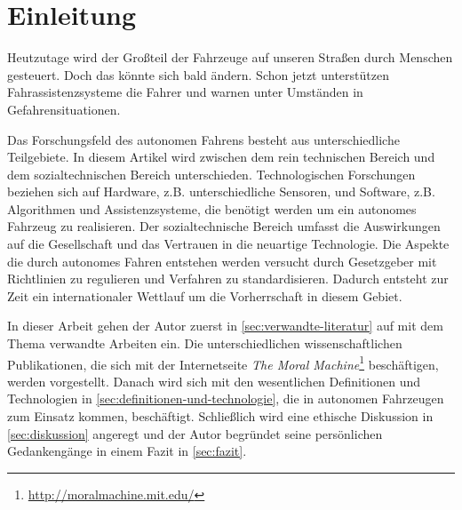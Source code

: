 \section{Einleitung}

Heutzutage wird der Großteil der Fahrzeuge auf unseren Straßen durch Menschen gesteuert. Doch das könnte sich bald ändern. Schon jetzt unterstützen Fahrassistenzsysteme die Fahrer und warnen unter Umständen in Gefahrensituationen.

Das Forschungsfeld des autonomen Fahrens besteht aus unterschiedliche Teilgebiete. In diesem Artikel wird zwischen dem rein technischen Bereich und dem sozialtechnischen Bereich unterschieden. Technologischen Forschungen beziehen sich auf Hardware, z.B. unterschiedliche Sensoren, und Software, z.B. Algorithmen und Assistenzsysteme, die benötigt werden um ein autonomes Fahrzeug zu realisieren. Der sozialtechnische Bereich umfasst die Auswirkungen auf die Gesellschaft und das Vertrauen in die neuartige Technologie. Die Aspekte die durch autonomes Fahren entstehen werden versucht durch Gesetzgeber mit Richtlinien zu regulieren und Verfahren zu standardisieren. Dadurch entsteht zur Zeit ein internationaler Wettlauf um die Vorherrschaft in diesem Gebiet.

In dieser Arbeit gehen der Autor zuerst in \ref{sec:verwandte-literatur} auf mit dem Thema verwandte Arbeiten ein. Die unterschiedlichen wissenschaftlichen Publikationen, die sich mit der Internetseite \textit{The Moral Machine}\footnote{\url{http://moralmachine.mit.edu/}} beschäftigen, werden vorgestellt. Danach wird sich mit den wesentlichen Definitionen und Technologien in \ref{sec:definitionen-und-technologie}, die in autonomen Fahrzeugen zum Einsatz kommen,  beschäftigt. Schließlich wird eine ethische Diskussion in \ref{sec:diskussion} angeregt und der Autor begründet seine persönlichen Gedankengänge in einem Fazit in \ref{sec:fazit}.